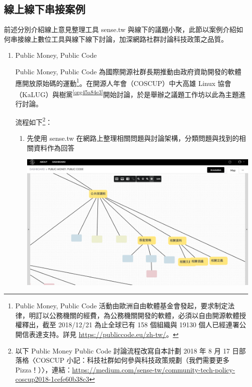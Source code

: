 \documentclass[12pt,a4paper]{article}
\begin{document}
\subsection{線上線下串接案例 }
\label{sec:org8a2eda9}
前述分別介紹線上意見整理工具 sense.tw 與線下的議題小聚，此節以案例介紹如何串接線上數位工具與線下線下討論，加深網路社群討論科技政策之品質。
\begin{enumerate}
\item Public Money, Public Code
\label{sec:org80c67bc}

Public Money, Public Code 為國際開源社群長期推動由政府資助開發的軟體應開放原始碼的運動\footnote{Public Money, Public Code 活動由歐洲自由軟體基金會發起，要求制定法律，明訂以公務機關的經費，為公務機關開發的軟體，必須以自由開源軟體授權釋出，截至 2018/12/21 為止全球已有 158 個組織與 19130 個人已經連署公開信表達支持。詳見 \url{https://publiccode.eu/zh-tw/}。}。在開源人年會（COSCUP）中大高雄 Linux 協會（KaLUG）與樹黨\textsuperscript{\ref{org45a84e3}}開始討論，於是舉辦之議題工作坊以此為主題進行討論。

流程如下\footnote{以下 Public Money Public Code 討論流程改寫自本計劃 2018 年 8 月 17 日部落格〈COSCUP 小記：科技社群如何參與科技政策規劃（我們需要更多 Pizza！）〉，連結：\url{https://medium.com/sense-tw/community-tech-policy-coscup2018-1cefe60b38c3}}：

\begin{enumerate}
\item 先使用 sense.tw 在網路上整理相關問題與討論架構，分類問題與找到的相關資料作為回答
\begin{center}
\includegraphics[width=.9\linewidth]{./images/pmpc2.png}
\end{center}


\end{enumerate}
\end{enumerate}
\end{document}
